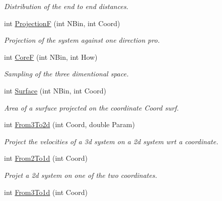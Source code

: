 \begin{DoxyCompactItemize}
\begin{DoxyCompactList}\small\item\em Distribution of the end to end distances. \end{DoxyCompactList}\item 
int \hyperlink{classElPoly_aa2dbcd635807df0929968ec8932631ab}{ProjectionF} (int N\+Bin, int Coord)\hypertarget{classElPoly_aa2dbcd635807df0929968ec8932631ab}{}\label{classElPoly_aa2dbcd635807df0929968ec8932631ab}

\begin{DoxyCompactList}\small\item\em Projection of the system against one direction  pro. \end{DoxyCompactList}\item 
int \hyperlink{classElPoly_a04dd79cb2f5e46ae301b6dc1d57db28a}{CoreF} (int N\+Bin, int How)
\begin{DoxyCompactList}\small\item\em Sampling of the three dimentional space. \end{DoxyCompactList}\item 
int \hyperlink{classElPoly_a52844d3cee2d60eb47889fb021e10fc8}{Surface} (int N\+Bin, int Coord)\hypertarget{classElPoly_a52844d3cee2d60eb47889fb021e10fc8}{}\label{classElPoly_a52844d3cee2d60eb47889fb021e10fc8}

\begin{DoxyCompactList}\small\item\em Area of a surfuce projected on the coordinate Coord  surf. \end{DoxyCompactList}\item 
int \hyperlink{classElPoly_a4e71c4abd7c3ed37f29a8fcae064fd32}{From3\+To2d} (int Coord, double Param)\hypertarget{classElPoly_a4e71c4abd7c3ed37f29a8fcae064fd32}{}\label{classElPoly_a4e71c4abd7c3ed37f29a8fcae064fd32}

\begin{DoxyCompactList}\small\item\em Project the velocities of a 3d system on a 2d system wrt a coordinate. \end{DoxyCompactList}\item 
int \hyperlink{classElPoly_a30e6658740047a2fdd996e2b843e91b9}{From2\+To1d} (int Coord)\hypertarget{classElPoly_a30e6658740047a2fdd996e2b843e91b9}{}\label{classElPoly_a30e6658740047a2fdd996e2b843e91b9}

\begin{DoxyCompactList}\small\item\em Projet a 2d system on one of the two coordinates. \end{DoxyCompactList}\item 
int \hyperlink{classElPoly_a0b9109dcecbeec17c94472b5e638580a}{From3\+To1d} (int Coord)\hypertarget{classElPoly_a0b9109dcecbeec17c94472b5e638580a}{}\label{classElPoly_a0b9109dcecbeec17c94472b5e638580a}


\end{DoxyCompactItemize}
